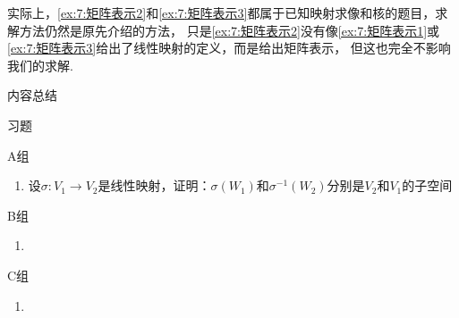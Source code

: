 实际上，\autoref{ex:7:矩阵表示2}和\autoref{ex:7:矩阵表示3}都属于已知映射求像和核的题目，求解方法仍然是原先介绍的方法，
只是\autoref{ex:7:矩阵表示2}没有像\autoref{ex:7:矩阵表示1}或\autoref{ex:7:矩阵表示3}给出了线性映射的定义，而是给出矩阵表示，
但这也完全不影响我们的求解.

\vspace{2ex}
\centerline{\heiti \Large 内容总结}

\vspace{2ex}

\centerline{\heiti \Large 习题}
\vspace{2ex}
{\kaishu }
\begin{flushright}
    \kaishu

\end{flushright}
\centerline{\heiti A组}
\begin{enumerate}
    \item 设$\sigma: V_1\to V_2$是线性映射，证明：$\sigma(W_1)$和$\sigma^{-1}(W_2)$分别是$V_2$和$V_1$的子空间
\end{enumerate}
\centerline{\heiti B组}
\begin{enumerate}
    \item
\end{enumerate}
\centerline{\heiti C组}
\begin{enumerate}
    \item
\end{enumerate}
